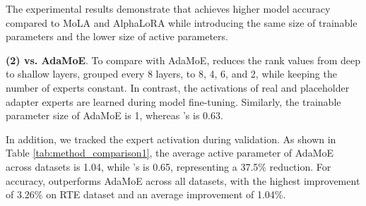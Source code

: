 The experimental results demonstrate that \name achieves higher model accuracy compared to MoLA and AlphaLoRA while introducing the same size of trainable parameters and the lower size of active parameters.

\begin{table}[t]
    \centering
    \caption{\textbf{Performances of AdaMoE and \name}. Allocating 8 experts and 8 placeholder experts to each layer and employ a Top-2 activation strategy. AdaMoE's adapter rank is 8 and \name sets the rank to $\triangledown$ across layers.}
    \label{tab:method_comparison2}
    \vspace{-10pt}
\end{table}

\textbf{(2) \name vs. AdaMoE}. 
To compare with AdaMoE, \name reduces the rank values from deep to shallow layers, grouped every 8 layers, to 8, 4, 6, and 2, while keeping the number of experts constant. In contrast, the activations of real and placeholder adapter experts are learned during model fine-tuning. Similarly, the trainable parameter size of AdaMoE is 1, whereas \name's is 0.63.

In addition, we tracked the expert activation during validation. As shown in Table \ref{tab:method_comparison1}, the average active parameter of AdaMoE across datasets is 1.04, while \name's is 0.65, representing a 37.5\% reduction. For accuracy, \name outperforms AdaMoE across all datasets, with the highest improvement of 3.26\% on RTE dataset and an average improvement of 1.04\%. 

